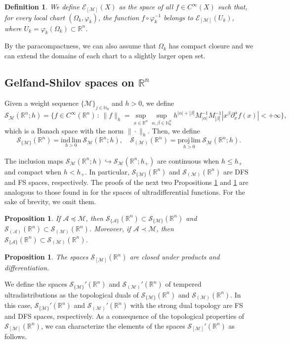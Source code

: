 \documentclass[11pt,reqno]{amsart}
\numberwithin{equation}{section}
\newtheorem{definition}[theorem]{Definition}
\newtheorem{proposition}[theorem]{Proposition}
\newcommand{\R}{{\mathbb{R}}} %
\newcommand{\N}{{\mathbb{N}}} %
\newcommand{\caS}{{\mathcal{S}}}
\newcommand{\M}{{\mathcal{M}}} %
\newcommand{\A}{{\mathcal{A}}} %
\begin{document}
\begin{definition}
	We define $\mathcal{E}_{[\M]}(X)$ as the space of all $f\in C^\infty(X)$ such that, for every local chart $(\Omega_k,\varphi_k)$, the function $f\circ\varphi_k^{-1}$ belongs to $\mathcal{E}_{[\M]}(U_k)$, where $U_k=\varphi_k(\Omega_k)\subset\R^n$.
\end{definition}
%
By the paracompactness, we can also assume that $\Omega_k$ has compact closure and we can extend the domains of each chart to a slightly larger open set.

\subsection{Gelfand-Shilov spaces on $\R^n$}
Given a weight sequence $\{\M\}_{j\in\N_0}$ and $h>0$, we define
%
\[ \caS_{\M}(\R^n;h) = \{f\in C^\infty(\R^n) \, : \, \|f\|_h = \sup_{x\in\mathbb{R}^n} \sup_{\alpha,\beta\in\N_0^n} h^{|\alpha|+|\beta|} M_{|\alpha|}^{-1} M_{|\beta|}^{-1} |x^\beta\partial_x^\alpha f(x)| < +\infty\}, \]
which is a Banach space with the norm $\|\cdot\|_h$. Then, we define
\[\mathcal{S}_{\{\M\}}(\R^n) = \underset{h>0}{\mathrm{ind\,lim}}\ \caS_{\M}(\R^n;h),
\quad \mathcal{S}_{(\M)}(\R^n) = \underset{h>0}{\mathrm{proj\,lim}}\ \caS_{\M}(\R^n;h).\]


The inclusion maps $\caS_{\M}(\R^n;h)\hookrightarrow \caS_{\M}(\R^n;h_+)$ are continuous when $h\leq h_+$ and compact when $h<h_+$. In particular, $\mathcal{S}_{\{\M\}}(\R^n)$ and $\mathcal{S}_{(\M)}(\R^n)$ are DFS and FS spaces, respectively. The proofs of the next two Propositions \ref{prop:gsspcs_a} and \ref{prop:gsspcs_b} are analogous to those found in \cite{Komatsu_ultra_1} for the spaces of ultradifferential functions. For the sake of brevity, we omit them.

\begin{proposition}\label{prop:gsspcs_a}
	If $\A\preceq \M$, then $\mathcal{S}_{\{\A\}}(\R^n) \subset \mathcal{S}_{\{\M\}}(\R^n)$ and $\mathcal{S}_{(\A)}(\R^n) \subset \mathcal{S}_{(\M)}(\R^n)$. Moreover, if $\A\prec\M$, then $\mathcal{S}_{\{\A\}}(\R^n) \subset \mathcal{S}_{(\M)}(\R^n)$.
\end{proposition}
%
\begin{proposition}\label{prop:gsspcs_b}
	The spaces $\mathcal{S}_{[\M]}(\R^n)$ are closed under products and differentiation.
\end{proposition}
%

We define the spaces $\mathcal{S}_{\{\M\}}'(\R^n)$ and $\mathcal{S}_{(\M)}'(\R^n)$ of tempered ultradistributions as the topological duals of $\mathcal{S}_{\{\M\}}(\R^n)$ and $\mathcal{S}_{(\M)}(\R^n)$. In this case, $\mathcal{S}_{\{\M\}}'(\R^n)$ and $\mathcal{S}_{(\M)}'(\R^n)$ with the strong dual topology are FS and DFS spaces, respectively. As a consequence of the topological properties of $\caS_{[\M]}(\R^n)$, we can characterize the elements of the spaces $\mathcal{S}_{[\M]}'(\R^n)$ as follows.
\end{document}
